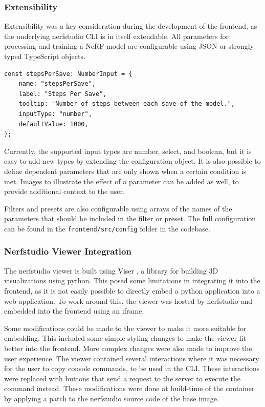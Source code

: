 \subsubsection{Extensibility}

Extensibility was a key consideration during the development of the frontend, as the underlying nerfstudio CLI is in itself extendable.
All parameters for processing and training a NeRF model are configurable using JSON or strongly typed TypeScript objects.

\begin{lstlisting}[style=ES6, caption=Parameter Option configuration]
const stepsPerSave: NumberInput = {
	name: "stepsPerSave",
	label: "Steps Per Save",
	tooltip: "Number of steps between each save of the model.",
	inputType: "number",
	defaultValue: 1000,
};
\end{lstlisting}

Currently, the supported input types are number, select, and boolean, but it is easy to add new types by extending the configuration object.
It is also possible to define dependent parameters that are only shown when a certain condition is met.
Images to illustrate the effect of a parameter can be added as well, to provide additional context to the user.

Filters and presets are also configurable using arrays of the names of the parameters that should be included in the filter or preset.
The full configuration can be found in the \texttt{frontend/src/config} folder in the codebase.

\subsubsection{Nerfstudio Viewer Integration}

The nerfstudio viewer is built using Viser \cite{noauthor_nerfstudio-projectviser_2024}, a library for building 3D visualizations using python.
This posed some limitations in integrating it into the frontend, as it is not easily possible to directly embed a python application into a web application.
To work around this, the viewer was hosted by nerfstudio and embedded into the frontend using an iframe.

Some modifications could be made to the viewer to make it more suitable for embedding.
This included some simple styling changes to make the viewer fit better into the frontend.
More complex changes were also made to improve the user experience.
The viewer contained several interactions where it was necessary for the user to copy console commands, to be used in the CLI.
These interactions were replaced with buttons that send a request to the server to execute the command instead.
These modifications were done at build-time of the container by applying a patch to the nerfstudio source code of the base image.

